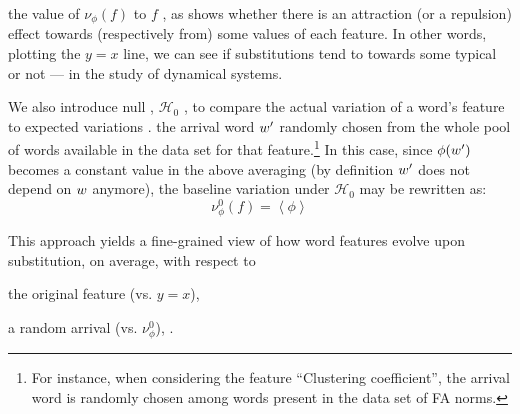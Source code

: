  the value of $\nu_{\phi}(f)$ to $f$ , as  shows whether there is an attraction (or a repulsion) effect towards (respectively from) some values of each feature.
In other words, plotting the $y=x$ line, we can see if substitutions tend to  towards some typical  or not ---  in the study of dynamical systems.

We also introduce  null , $\mathcal{H}_0$ , to compare the actual variation of a word's feature to expected variations .
 the arrival word $w'$  randomly chosen from the whole pool of words available in the data set for that feature.\footnote{
For instance, when considering the feature ``Clustering coefficient'', the arrival word is randomly chosen among words present in the data set of FA norms.
}
In this case, since $\phi(w')$ becomes a constant value in the above averaging (by definition $w'$ does not depend on $w$ anymore), the baseline variation under $\mathcal{H}_0$ may be rewritten as:
$$\nu_{\phi}^0 (f) = \left<\phi\right>$$

This approach yields a fine-grained view of how word features evolve upon substitution, on average, with respect to
\begin{seriate}
\item the original feature (\hbox{vs.} $y=x$),
\item a random arrival (\hbox{vs.} $\nu_{\phi}^0$), .
\end{seriate}

